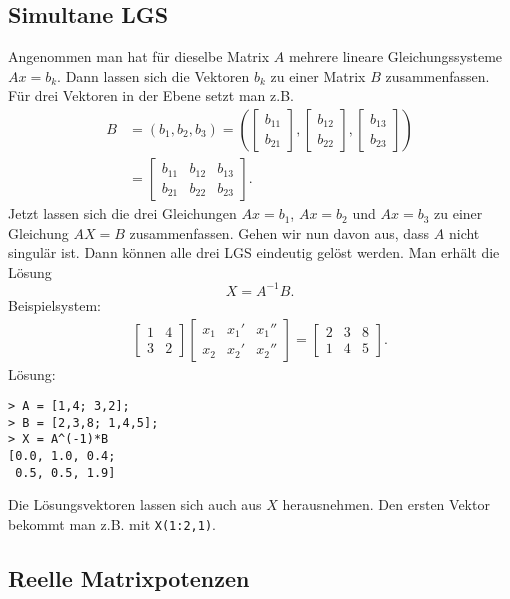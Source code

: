 \documentclass[a4paper,11pt,fleqn,twocolumn,twoside,dvipdfmx]{scrartcl}
\begin{document}
\subsection{Simultane LGS}

Angenommen man hat für dieselbe Matrix $A$ mehrere lineare
Gleichungssysteme $Ax=b_k$. Dann lassen sich
die Vektoren $b_k$ zu einer Matrix $B$ zusammenfassen.
Für drei Vektoren in der Ebene setzt man z.B.
\begin{align*}
B &= (b_1,b_2,b_3)
= (\begin{bmatrix}b_{11}\\ b_{21}\end{bmatrix},
\begin{bmatrix}b_{12}\\ b_{22}\end{bmatrix},
\begin{bmatrix}b_{13}\\ b_{23}\end{bmatrix})\\
&= \begin{bmatrix}
b_{11} & b_{12} & b_{13}\\
b_{21} & b_{22} & b_{23}
\end{bmatrix}.
\end{align*}
Jetzt lassen sich die drei Gleichungen $Ax=b_1$, $Ax=b_2$ und
$Ax=b_3$ zu einer Gleichung $AX=B$ zusammenfassen.
Gehen wir nun davon aus, dass $A$ nicht singulär ist. Dann können
alle drei LGS eindeutig gelöst werden. Man erhält die Lösung
\[X = A^{-1}B.\]
Beispielsystem:
\begin{gather*}
\begin{bmatrix}
1 & 4\\
3 & 2
\end{bmatrix}
\begin{bmatrix}
x_1 & x_1' & x_1''\\
x_2 & x_2' & x_2''
\end{bmatrix}
= \begin{bmatrix}
2 & 3 & 8\\
1 & 4 & 5
\end{bmatrix}.
\end{gather*}
Lösung:
\begin{verbatim}
> A = [1,4; 3,2];
> B = [2,3,8; 1,4,5];
> X = A^(-1)*B
[0.0, 1.0, 0.4;
 0.5, 0.5, 1.9]
\end{verbatim}
Die Lösungsvektoren lassen sich auch aus $X$ herausnehmen.
Den ersten Vektor bekommt man z.B. mit \texttt{X(1:2,1)}.


\subsection{Reelle Matrixpotenzen}
\end{document}

